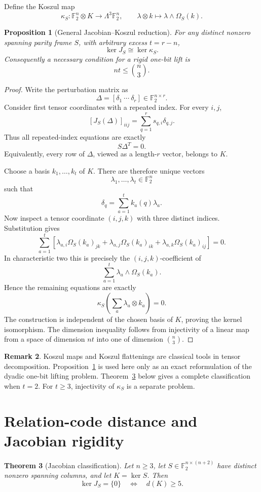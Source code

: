 \documentclass[11pt]{article}
\newtheorem{theorem}{Theorem}
\newtheorem{proposition}[theorem]{Proposition}
\theoremstyle{definition}
\newtheorem{remark}[theorem]{Remark}
\newcommand{\F}{\mathbb F}
\begin{document}
Define the Koszul map
\[
\kappa_S:
\F_2^n\otimes K
\longrightarrow
\Lambda^3\F_2^n,
\qquad
\lambda\otimes k
\longmapsto
\lambda\wedge\Omega_S(k).
\]

\begin{proposition}[General Jacobian--Koszul reduction]\label{prop:koszul}
For any distinct nonzero spanning parity frame \(S\), with arbitrary excess \(t=r-n\),
\[
\boxed{
\ker J_S\cong\ker\kappa_S.
}
\]
Consequently a necessary condition for a rigid one-bit lift is
\[
nt\le\binom n3.
\]
\end{proposition}

\begin{proof}
Write the perturbation matrix as
\[
\Delta=[\delta_1\ \cdots\ \delta_r]\in\F_2^{n\times r}.
\]
Consider first tensor coordinates with a repeated index. For every \(i,j\),
\[
\left[J_S(\Delta)\right]_{iij}
=
\sum_{q=1}^r s_{q,i}\delta_{q,j}.
\]
Thus all repeated-index equations are exactly
\[
S\Delta^T=0.
\]
Equivalently, every row of \(\Delta\), viewed as a length-\(r\) vector, belongs to \(K\).

Choose a basis \(k_1,\ldots,k_t\) of \(K\). There are therefore unique vectors
\[
\lambda_1,\ldots,\lambda_t\in\F_2^n
\]
such that
\[
\delta_q=\sum_{a=1}^t k_a(q)\lambda_a.
\]
Now inspect a tensor coordinate \((i,j,k)\) with three distinct indices. Substitution gives
\[
\sum_{a=1}^t
\left[
\lambda_{a,i}\Omega_S(k_a)_{jk}
+
\lambda_{a,j}\Omega_S(k_a)_{ik}
+
\lambda_{a,k}\Omega_S(k_a)_{ij}
\right]=0.
\]
In characteristic two this is precisely the \((i,j,k)\)-coefficient of
\[
\sum_{a=1}^t\lambda_a\wedge\Omega_S(k_a).
\]
Hence the remaining equations are exactly
\[
\kappa_S\!\left(\sum_a\lambda_a\otimes k_a\right)=0.
\]
The construction is independent of the chosen basis of \(K\), proving the kernel isomorphism. The dimension inequality follows from injectivity of a linear map from a space of dimension \(nt\) into one of dimension \(\binom n3\).
\end{proof}

\begin{remark}
Koszul maps and Koszul flattenings are classical tools in tensor decomposition. Proposition~\ref{prop:koszul} is used here only as an exact reformulation of the dyadic one-bit lifting problem. Theorem~\ref{thm:jac} below gives a complete classification when \(t=2\). For \(t\ge3\), injectivity of \(\kappa_S\) is a separate problem.
\end{remark}

\section{Relation-code distance and Jacobian rigidity}
\begin{theorem}[Jacobian classification]\label{thm:jac}
Let \(n\ge3\), let \(S\in\F_2^{n\times(n+2)}\) have distinct nonzero spanning columns, and let \(K=\ker S\). Then
\[
\boxed{
\ker J_S=\{0\}
\quad\Longleftrightarrow\quad
d(K)\ge5.
}
\]
\end{theorem}
\end{document}
